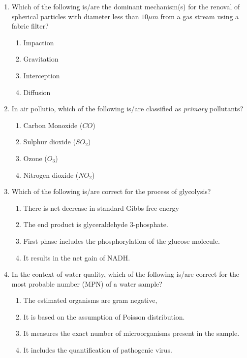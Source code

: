 \documentclass[journal]{IEEEtran}
\begin{document}
\begin{enumerate}[start=1]
\item Which of the following is/are the dominant mechanism(s) for the renoval of spherical particles with diameter less than $10 \mu m$ from a gas stream using a fabric filter? \hfill{}
\begin{enumerate}
    \item Impaction
    \item Gravitation
    \item Interception
    \item Diffusion
\end{enumerate}

\item In air pollutio, which of the following is/are classified as \textit{primary} pollutants? \hfill{}
\begin{enumerate}
    \item Carbon Monoxide ($CO$)
    \item Sulphur dioxide ($SO_2$)
    \item Ozone ($O_3$)
    \item  Nitrogen dioxide ($NO_2$)
\end{enumerate}

\item Which of the following is/are correct for the process of glycolysis? \hfill{}
\begin{enumerate}
    \item There is net decrease in standard Gibbs free energy
    \item The end product is glyceraldehyde 3-phosphate.
    \item First phase includes the phosphorylation of the glucose molecule.
    \item It results in the net gain of NADH.
\end{enumerate}

\item In the context of water quality, which of the following is/are correct for the most probable number (MPN) of a water sample? \hfill{}
\begin{enumerate}
    \item The estimated organisms are gram negative,
    \item It is based on the assumption of Poisson distribution.
    \item It measures the exact number of microorganisms present in the sample.
    \item It includes the quantification of pathogenic virus.
\end{enumerate}


\end{enumerate}
\end{document}
